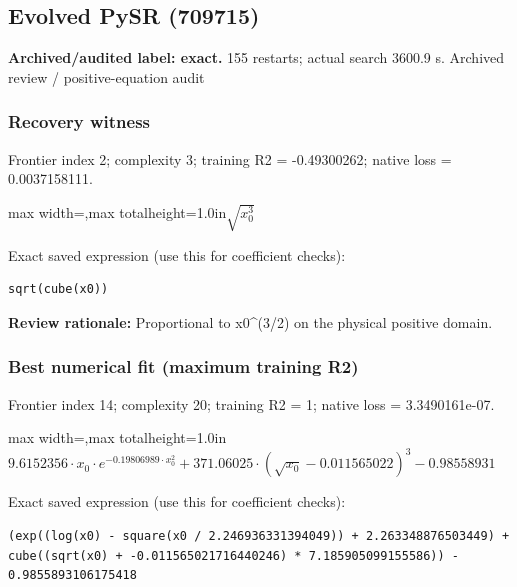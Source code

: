 \documentclass[10pt,letterpaper,landscape]{article}
\begin{document}
\begin{minipage}[t]{0.485\textwidth}
\subsection*{Evolved PySR (709715)}
\textbf{Archived/audited label: exact.} 155 restarts; actual search 3600.9 s.
{\small Archived review / positive-equation audit}
\subsubsection*{Recovery witness}
Frontier index 2; complexity 3; training R2 = -0.49300262; native loss = 0.0037158111.
\begin{center}\begin{adjustbox}{max width=\linewidth,max totalheight=1.0in}$\displaystyle \sqrt{x_{0}^{3}}$\end{adjustbox}\end{center}
{\scriptsize Exact saved expression (use this for coefficient checks):}
\begin{lstlisting}
sqrt(cube(x0))
\end{lstlisting}
{\small\textbf{Review rationale:} Proportional to x0\textasciicircum{}(3/2) on the physical positive domain.}
\subsubsection*{Best numerical fit (maximum training R2)}
Frontier index 14; complexity 20; training R2 = 1; native loss = 3.3490161e-07.
\begin{center}\begin{adjustbox}{max width=\linewidth,max totalheight=1.0in}$\displaystyle 9.6152356 \cdot x_{0} \cdot e^{- 0.19806989 \cdot x_{0}^{2}} + 371.06025 \cdot \left(\sqrt{x_{0}} - 0.011565022\right)^{3} - 0.98558931$\end{adjustbox}\end{center}
{\scriptsize Exact saved expression (use this for coefficient checks):}
\begin{lstlisting}
(exp((log(x0) - square(x0 / 2.246936331394049)) + 2.263348876503449) + cube((sqrt(x0) + -0.011565021716440246) * 7.185905099155586)) - 0.9855893106175418
\end{lstlisting}
\end{minipage}
\clearpage{}\label{kepler-10003}
\end{document}
